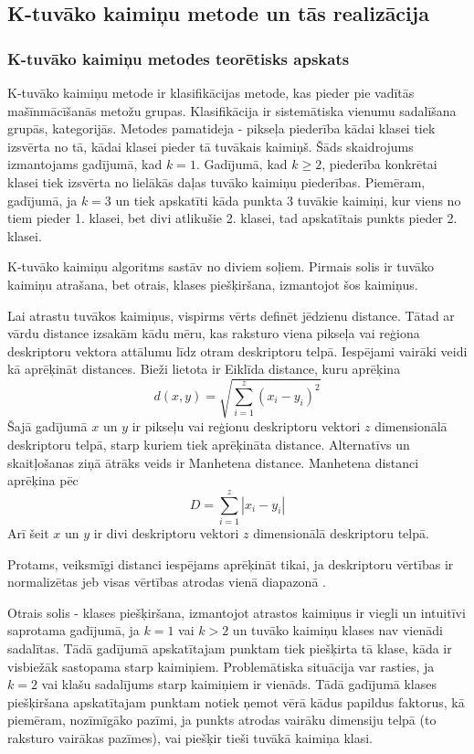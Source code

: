 \documentclass[12pt,paper=a4]{report}
\begin{document}
\subsection{K-tuvāko kaimiņu metode un tās realizācija}
\subsubsection{K-tuvāko kaimiņu metodes teorētisks apskats}
K-tuvāko kaimiņu metode ir klasifikācijas metode, kas pieder pie vadītās mašīnmācīšanās metožu grupas. Klasifikācija ir sistemātiska vienumu sadalīšana grupās, kategorijās. Metodes pamatideja - pikseļa piederība kādai klasei tiek izsvērta no tā, kādai klasei pieder tā tuvākais kaimiņš. Šāds skaidrojums izmantojams gadījumā, kad $k=1$. Gadījumā, kad $k \geq 2$, piederība konkrētai klasei tiek izsvērta no lielākās daļas tuvāko kaimiņu piederības. Piemēram, gadījumā, ja $k=3$ un tiek apskatīti kāda punkta 3 tuvākie kaimiņi, kur viens no tiem pieder 1. klasei, bet divi atlikušie 2. klasei, tad apskatītais punkts pieder 2. klasei.\cite{knn} \par 
K-tuvāko kaimiņu algoritms sastāv no diviem soļiem. Pirmais solis ir tuvāko kaimiņu atrašana, bet otrais, klases piešķiršana, izmantojot šos kaimiņus.\cite{knn} \par
Lai atrastu tuvākos kaimiņus, vispirms vērts definēt jēdzienu distance. Tātad ar vārdu distance izsakām kādu mēru, kas raksturo viena pikseļa vai reģiona deskriptoru vektora attālumu līdz otram deskriptoru telpā. Iespējami vairāki veidi kā aprēķināt distances. Bieži lietota ir Eiklīda distance, kuru aprēķina
\begin{equation}
d(x,y)=\sqrt{\sum_{i=1}^{z} (x_i-y_i)^2}
\end{equation}
Šajā gadījumā $x$ un $y$ ir pikseļu vai reģionu deskriptoru vektori $z$ dimensionālā deskriptoru telpā, starp kuriem tiek aprēķināta distance. Alternatīvs un skaitļošanas ziņā ātrāks veids ir Manhetena distance. Manhetena distanci aprēķina pēc
\begin{equation}
D=\sum_{i=1}^{z}|x_i - y_i|
\end{equation}
Arī šeit $x$ un $y$ ir divi deskriptoru vektori $z$ dimensionālā deskriptoru telpā.\cite{knndistance} \par
Protams, veiksmīgi distanci iespējams aprēķināt tikai, ja deskriptoru vērtības ir normalizētas jeb visas vērtības atrodas vienā diapazonā \cite{knn}.\par
Otrais solis - klases piešķiršana, izmantojot atrastos kaimiņus ir viegli un intuitīvi saprotama gadījumā, ja $k=1$ vai $k>2$ un tuvāko kaimiņu klases nav vienādi sadalītas. Tādā gadījumā apskatītajam punktam tiek piešķirta tā klase, kāda ir visbiežāk sastopama starp kaimiņiem. Problemātiska situācija var rasties, ja $k=2$ vai klašu sadalījums starp kaimiņiem ir vienāds. Tādā gadījumā klases piešķiršana apskatītajam punktam notiek ņemot vērā kādus papildus faktorus, kā piemēram, nozīmīgāko pazīmi, ja punkts atrodas vairāku dimensiju telpā (to raksturo vairākas pazīmes), vai piešķir tieši tuvākā kaimiņa klasi. \cite{knn} \par
\end{document}
